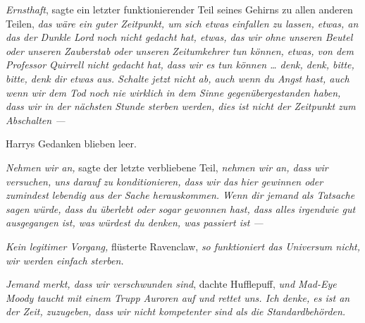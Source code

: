 \emph{Ernsthaft}, sagte ein letzter funktionierender Teil seines Gehirns zu allen anderen Teilen, \emph{das wäre ein guter Zeitpunkt, um sich etwas einfallen zu lassen, etwas, an das der Dunkle Lord noch nicht gedacht hat, etwas, das wir ohne unseren Beutel oder unseren Zauberstab oder unseren Zeitumkehrer tun können, etwas, von dem Professor Quirrell nicht gedacht hat, dass wir es tun können … denk, denk, bitte, bitte, denk dir etwas aus. Schalte jetzt nicht ab, auch wenn du Angst hast, auch wenn wir dem Tod noch nie wirklich in dem Sinne gegenübergestanden haben, dass wir in der nächsten Stunde sterben werden, \emph{dies ist nicht der Zeitpunkt zum Abschalten —}}

Harrys Gedanken blieben leer.

\emph{Nehmen wir an,} sagte der letzte verbliebene Teil, \emph{nehmen wir an, dass wir versuchen, uns darauf zu konditionieren, dass wir das hier gewinnen oder zumindest lebendig aus der Sache herauskommen. Wenn dir jemand \emph{als Tatsache} sagen würde, dass du überlebt oder sogar gewonnen hast, dass alles irgendwie gut ausgegangen ist, was würdest du denken, was passiert ist —}

\emph{Kein legitimer Vorgang,} flüsterte Ravenclaw, \emph{so funktioniert das Universum nicht, wir werden einfach sterben.}

\emph{Jemand merkt, dass wir verschwunden sind}, dachte Hufflepuff, \emph{und Mad-Eye Moody taucht mit einem Trupp Auroren auf und rettet uns. Ich denke, es ist an der Zeit, zuzugeben, dass wir nicht kompetenter sind als die Standardbehörden.}

